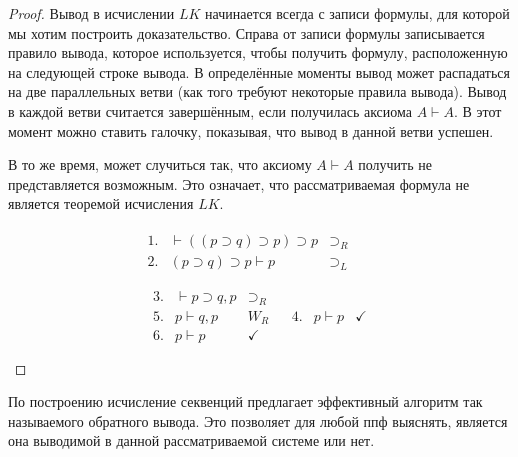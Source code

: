 \begin{proof}
    Вывод в исчислении $LK$ начинается всегда с записи формулы, для которой мы хотим построить доказательство. Справа от записи формулы записывается правило вывода, которое используется, чтобы получить формулу, расположенную на следующей строке вывода. В определённые моменты вывод может распадаться на две параллельных ветви (как того требуют некоторые правила вывода). Вывод в каждой ветви считается завершённым, если получилась аксиома $A\vdash A$. В этот момент можно ставить галочку, показывая, что вывод в данной ветви успешен.

    В то же время, может случиться так, что аксиому $A \vdash A$ получить не представляется возможным. Это означает, что рассматриваемая формула не является теоремой исчисления $LK$.

    \begin{equation*}
        \begin{array}{c}
            \begin{array}{llr}
                1.  & \vdash ((p \supset q) \supset p) \supset p 
                    & \supset_R 
                    \\
                2.  & (p \supset q) \supset p \vdash p
                    & \supset_L
                    \\
            \end{array}
            \\
            \begin{array}{c|c}
                \begin{array}{llr}
                    3.  & \vdash p \supset q, p
                        & \supset_R
                        \\
                    5.  & p \vdash q, p
                        & W_R
                        \\
                    6.  & p \vdash p
                        & \checkmark
                        \\
                \end{array}
                &
                \begin{array}{llr}
                    4.  & p \vdash p
                        & \checkmark
                        \\
                \end{array}
            \end{array}
        \end{array}
    \end{equation*}
\end{proof}

По построению исчисление секвенций предлагает эффективный алгоритм так называемого обратного вывода. Это позволяет для любой ппф выяснять, является она выводимой в данной рассматриваемой системе или нет.